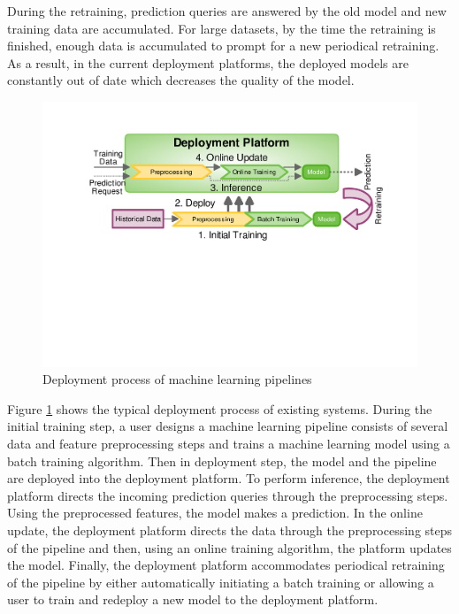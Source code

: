 During the retraining, prediction queries are answered by the old model and new training data are accumulated.
For large datasets, by the time the retraining is finished, enough data is accumulated to prompt for a new periodical retraining.
As a result, in the current deployment platforms, the deployed models are constantly out of date which decreases the quality of the model.

\begin{figure}[h!]
\centering
\includegraphics[width=\columnwidth]{../images/generic-motivational-example-v2.pdf}
\caption{Deployment process of machine learning pipelines}
\label{fig:motivational-example}
\end{figure}

Figure \ref{fig:motivational-example} shows the typical deployment process of existing systems.
During the initial training step, a user designs a machine learning pipeline consists of several data and feature preprocessing steps and trains a machine learning model using a batch training algorithm.
Then in deployment step, the model and the pipeline are deployed into the deployment platform.
To perform inference, the deployment platform directs the incoming prediction queries through the preprocessing steps.
Using the preprocessed features, the model makes a prediction.
In the online update, the deployment platform directs the data through the preprocessing steps of the pipeline and then, using an online training algorithm, the platform updates the model.
Finally, the deployment platform accommodates periodical retraining of the pipeline by either automatically initiating a batch training or allowing a user to train and redeploy a new model to the deployment platform.

